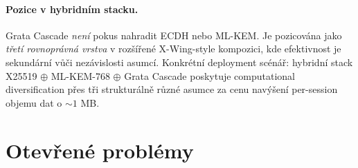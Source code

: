 \documentclass[11pt,a4paper]{article}
\begin{document}
\paragraph{Pozice v hybridním stacku.} Grata Cascade \emph{není} pokus nahradit ECDH nebo ML-KEM. Je pozicována jako \emph{třetí rovnoprávná vrstva} v rozšířené X-Wing-style kompozici, kde efektivnost je sekundární vůči nezávislosti asumcí. Konkrétní deployment scénář: hybridní stack X25519 $\oplus$ ML-KEM-768 $\oplus$ Grata Cascade poskytuje computational diversification přes tři strukturálně různé asumce za cenu navýšení per-session objemu dat o $\sim 1$ MB.

\section{Otevřené problémy}\label{sec:open}
\end{document}
